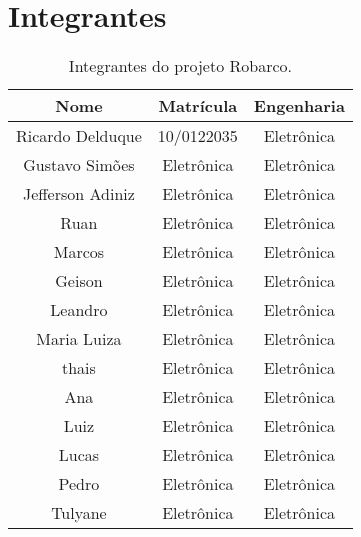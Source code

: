 \chapter*[Integrantes]{Integrantes}


\begin{table}[h]
	\centering
	\label{tab01}	
	\begin{tabular}{ccc}
		\toprule
		\textbf{Nome} & \textbf{Matrícula} & \textbf{Engenharia} \\
		\midrule
		Ricardo Delduque & 10/0122035 & Eletrônica          \\
		Gustavo Simões & Eletrônica & Eletrônica             \\
		Jefferson Adiniz & Eletrônica & Eletrônica                 \\
		Ruan  & Eletrônica & Eletrônica  \\
		Marcos & Eletrônica & Eletrônica                       \\
		Geison & Eletrônica & Eletrônica              \\
		Leandro  &Eletrônica & Eletrônica             \\
		Maria Luiza  &Eletrônica & Eletrônica             \\
		thais  &Eletrônica & Eletrônica             \\	
		Ana  &Eletrônica & Eletrônica             \\
		Luiz  &Eletrônica & Eletrônica             \\
		Lucas  &Eletrônica & Eletrônica             \\	
		Pedro  &Eletrônica & Eletrônica             \\
		Tulyane  &Eletrônica & Eletrônica             \\
		\bottomrule
	\end{tabular}	
	\caption{Integrantes do projeto Robarco.}
\end{table}